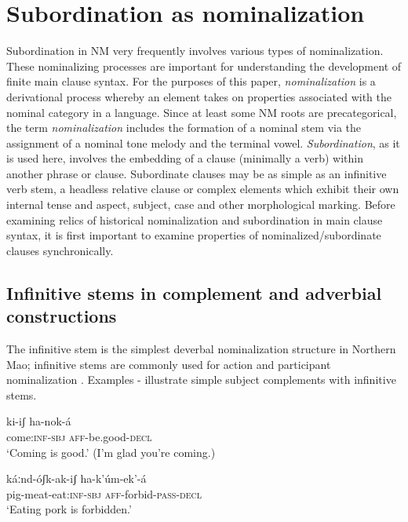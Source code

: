\documentclass[output=paper]{langsci/langscibook}
\begin{document}
\section{Subordination as nominalization}\label{sec:mahland:2}

Subordination in NM very frequently involves various types of nominalization. These nominalizing processes are important for understanding the development of finite main clause syntax. For the purposes of this paper, \textit{nominalization} is a derivational process whereby an element takes on properties associated with the nominal category in a language. Since at least some NM roots are precategorical, the term \textit{nominalization} includes the formation of a nominal stem via the assignment of a nominal tone melody and the terminal vowel. \textit{Subordination}, as it is used here, involves the embedding of a clause (minimally a verb) within another phrase or clause. Subordinate clauses may be as simple as an infinitive verb stem, a headless relative clause or complex elements which exhibit their own internal tense and aspect, subject, case and other morphological marking. Before examining relics of historical nominalization and subordination in main clause syntax, it is first important to examine properties of nominalized/subordinate clauses synchronically.

\subsection{Infinitive stems in complement and adverbial constructions}\label{sec:mahland:2.1}

  The infinitive stem is the simplest deverbal nominalization structure in Northern Mao; infinitive stems are commonly used for action and participant nominalization \citep[222]{AhlandM2012}. Examples - illustrate simple subject complements with infinitive stems. 

\ea\label{ex:mahland:33}
\gll ki-iʃ                 ha-nok-á   \\
come:\textsc{inf-sbj}     \textsc{aff}{}-be.good-\textsc{decl} \\
\glt `Coming is good.' (I'm glad you're coming.)
\z

\ea\label{ex:mahland:34}
\gll káːnd-óʃk-ak-iʃ          ha-k'úm-{\downstep}ek'-á\\
pig-meat-eat:\textsc{inf-sbj}   \textsc{aff}{}-forbid-\textsc{pass-decl} \\
\glt `Eating pork is forbidden.'
\z
\end{document}
